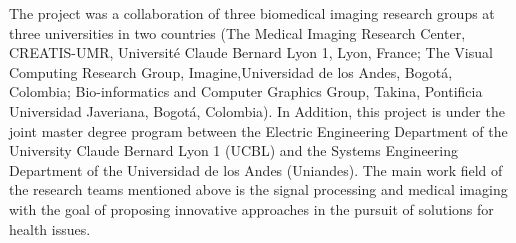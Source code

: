 The project was a collaboration of three biomedical imaging research groups at three universities in two countries (The Medical Imaging Research Center, CREATIS-UMR, Universit\'{e} Claude Bernard Lyon 1, Lyon, France; The Visual Computing Research Group, Imagine,Universidad de los Andes, Bogot\'{a}, Colombia; Bio-informatics and Computer Graphics Group, Takina, Pontificia Universidad Javeriana, Bogot\'{a}, Colombia). In Addition, this project is under the joint master degree program between the Electric Engineering Department of the University Claude Bernard Lyon 1 (UCBL) and the Systems Engineering Department of the Universidad de los Andes (Uniandes). 
The main work field of the research teams mentioned above is the signal processing and medical imaging with the goal of proposing innovative approaches in the pursuit of solutions for health issues. 

